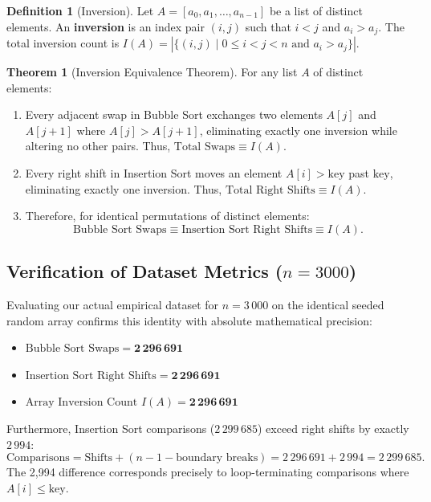 \documentclass[11pt,a4paper,oneside]{report}
\theoremstyle{definition}
\newtheorem{definition}{Definition}[chapter]
\newtheorem{theorem}{Theorem}[chapter]
\begin{document}
\begin{definition}[Inversion]
Let $A = [a_0, a_1, \dots, a_{n-1}]$ be a list of distinct elements. An \textbf{inversion} is an index pair $(i, j)$ such that $i < j$ and $a_i > a_j$. The total inversion count is $I(A) = |\{(i, j) \mid 0 \le i < j < n \text{ and } a_i > a_j\}|$.
\end{definition}

\begin{theorem}[Inversion Equivalence Theorem]
For any list $A$ of distinct elements:
\begin{enumerate}
    \item Every adjacent swap in Bubble Sort exchanges two elements $A[j]$ and $A[j+1]$ where $A[j] > A[j+1]$, eliminating exactly one inversion while altering no other pairs. Thus, $\text{Total Swaps} \equiv I(A)$.
    \item Every right shift in Insertion Sort moves an element $A[i] > \text{key}$ past $\text{key}$, eliminating exactly one inversion. Thus, $\text{Total Right Shifts} \equiv I(A)$.
    \item Therefore, for identical permutations of distinct elements:
    \begin{equation}
        \text{Bubble Sort Swaps} \equiv \text{Insertion Sort Right Shifts} \equiv I(A).
    \end{equation}
\end{enumerate}
\end{theorem}

\subsection{Verification of Dataset Metrics (\texorpdfstring{$n = 3000$}{n = 3000})}
Evaluating our actual empirical dataset for $n = 3\,000$ on the identical seeded random array confirms this identity with absolute mathematical precision:
\begin{itemize}
    \item $\text{Bubble Sort Swaps} = \mathbf{2\,296\,691}$
    \item $\text{Insertion Sort Right Shifts} = \mathbf{2\,296\,691}$
    \item $\text{Array Inversion Count } I(A) = \mathbf{2\,296\,691}$
\end{itemize}
Furthermore, Insertion Sort comparisons ($2\,299\,685$) exceed right shifts by exactly $2\,994$:
\begin{equation}
    \text{Comparisons} = \text{Shifts} + (n - 1 - \text{boundary breaks}) = 2\,296\,691 + 2\,994 = 2\,299\,685.
\end{equation}
The 2,994 difference corresponds precisely to loop-terminating comparisons where $A[i] \le \text{key}$.
\end{document}
